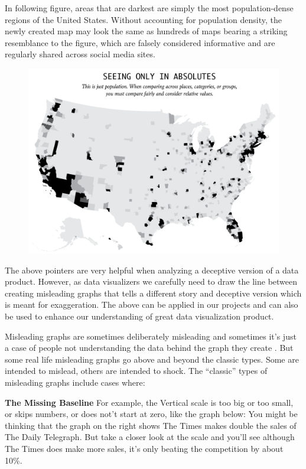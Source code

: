 \documentclass[]{book}
\theoremstyle{definition}
\theoremstyle{definition}
\theoremstyle{definition}
\theoremstyle{remark}
\begin{document}
In following figure, areas that are darkest are simply the most
population-dense regions of the United States. Without accounting for
population density, the newly created map may look the same as hundreds
of maps bearing a striking resemblance to the figure, which are falsely
considered informative and are regularly shared across social media
sites.

\begin{figure}
\centering
\includegraphics{images/Maps1.png}
\caption{}
\end{figure}

The above pointers are very helpful when analyzing a deceptive version
of a data product. However, as data visualizers we carefully need to
draw the line between creating misleading graphs that tells a different
story and deceptive version which is meant for exaggeration. The above
can be applied in our projects and can also be used to enhance our
understanding of great data visualization product.

Misleading graphs are sometimes deliberately misleading and sometimes
it's just a case of people not understanding the data behind the graph
they create \citep{andale_2014}. But some real life misleading graphs go
above and beyond the classic types. Some are intended to mislead, others
are intended to shock. The ``classic'' types of misleading graphs
include cases where:

\textbf{The Missing Baseline} For example, the Vertical scale is too big
or too small, or skips numbers, or does not't start at zero, like the
graph below: You might be thinking that the graph on the right shows The
Times makes double the sales of The Daily Telegraph. But take a closer
look at the scale and you'll see although The Times does make more
sales, it's only beating the competition by about 10\%.
\end{document}
